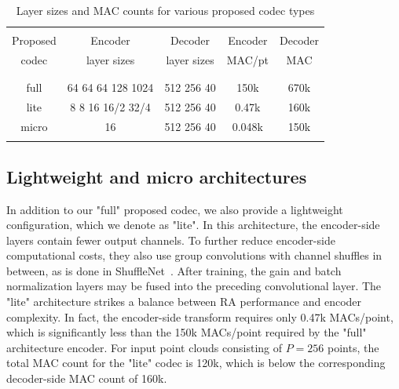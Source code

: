\begin{table}[t]
  \centering
  \caption{Layer sizes and MAC counts for various proposed codec types}
  \label{tbl:layers}
  \scriptsize
  \setlength{\tablesepskip}{-0.9\normalbaselineskip}
  \begin{tabular}[]{ccccc}
    \toprule
    \\[\tablesepskip]
    Proposed           & Encoder           & Decoder                      & Encoder            & Decoder   \\
    codec              & layer sizes       & layer sizes                  & MAC/pt             & MAC       \\
    \\[\tablesepskip]
    \midrule
    \\[\tablesepskip]
    full               & 64 64 64 128 1024 & 512 256 40                   & 150k               & 670k      \\
    lite               & 8 8 16 16/2 32/4  & 512 256 40                   & 0.47k              & 160k      \\
    micro              & 16                & 512 256 40                   & 0.048k             & 150k      \\
    \\[\tablesepskip]
    \bottomrule
  \end{tabular}
\end{table}



\subsection{Lightweight and micro architectures}

In addition to our "full" proposed codec, we also provide a lightweight configuration, which we denote as "lite".
In this architecture, the encoder-side layers contain fewer output channels.
To further reduce encoder-side computational costs, they also use group convolutions with channel shuffles in between, as is done in ShuffleNet~\cite{zhang2017shufflenet}.
After training, the gain and batch normalization layers may be fused into the preceding convolutional layer.
The "lite" architecture strikes a balance between RA performance and encoder complexity.
In fact, the encoder-side transform requires only 0.47k MACs/point, which is significantly less than the 150k MACs/point required by the "full" architecture encoder.
For input point clouds consisting of $P=256$ points, the total MAC count for the "lite" codec is 120k, which is below the corresponding decoder-side MAC count of 160k.  %

